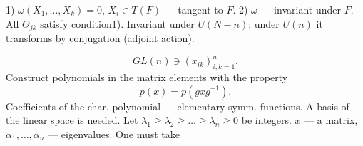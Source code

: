 1) $\omega (X_1,\dots, X_k)=0$, $X_i\in T (F)$ --- tangent to $F$.
2) $\omega$ --- invariant under $F$.
All $\Theta_{jk}$ satisfy condition1).
Invariant under $U (N-n)$; under $U (n)$ it transforms by conjugation (adjoint action).
\begin{center}\end{center}
\begin{equation*}GL (n)\ni (x_{ik})_{i, k=1}^n.\end{equation*}
Construct polynomials in the matrix elements with the property
\begin{equation*}p (x)=p (gxg^{-1}).\end{equation*}
Coefficients of the char. polynomial --- elementary symm. functions.
A basis of the linear space is needed.
Let $\lambda_1\ge\lambda_2\ge\dots\ge\lambda_n\ge0$ be integers.
$x$ --- a matrix, $\alpha_1,\dots,\alpha_n$ --- eigenvalues. One must take


